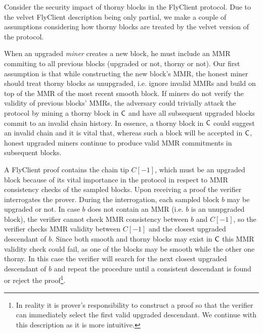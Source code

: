 	Consider the security impact of thorny blocks in the FlyClient protocol.
	Due to the velvet FlyClient description being only partial, we
	make a couple of assumptions considering how thorny blocks are treated by the velvet version of the protocol.

	When an upgraded \emph{miner} creates a new block, he must include an MMR
	commiting to all previous blocks (upgraded or not, thorny or not).
	Our first assumption is that while constructing the new block's MMR, the honest miner should treat thorny blocks as unupgraded, 
	i.e. ignore invalid MMRs and build on top of the MMR of the most recent smooth block. 
	If miners do not verify the 
	validity of previous blocks' MMRs, the adversary could trivially attack the protocol by mining a thorny block in $\mathsf{C}$ and have all subsequent upgraded
	blocks commit to an invalid chain history.  
	In essence, a thorny block in $\mathsf{C}$ could suggest an invalid chain and it is vital that, whereas such a block will be accepted in $\mathsf{C}$, honest upgraded miners continue to 
	produce valid MMR commitments in subsequent blocks.
	
	A FlyClient proof contains the chain tip $C[-1]$, which must be an upgraded block because of its vital importance in the protocol in respect to MMR consistency checks of the sampled blocks. 
	Upon receiving a proof the verifier interrogates the prover. During the interrogation, each sampled block $b$ may
	be upgraded or not. In case $b$ does not contain an MMR (i.e. $b$ is an unupgraded block), the verifier cannot check MMR consistency
	between $b$ and $C[-1]$, so the verifier checks MMR validity between $C[-1]$ and the closest upgraded descendant of $b$.
	Since both smooth and thorny blocks may exist in $\mathsf{C}$ this MMR validity check could fail, as one of the blocks may be smooth while the other one thorny.
	In this case the verifier will search for the next closest upgraded descendant of $b$ and repeat the procedure until a consistent descendant is found or reject 
	the proof\footnote{
	In reality it is prover's responsibility to construct a proof so that the verifier can immediately select the first valid upgraded descendant. We continue 
	with this description as it is more intuitive.
	}.

